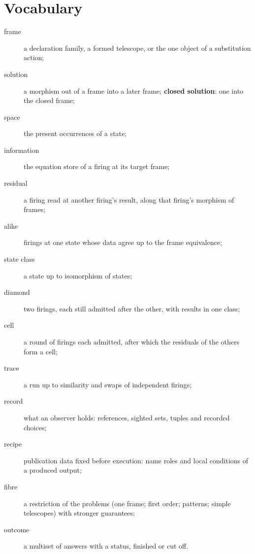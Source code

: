 \documentclass[11pt]{article}
\theoremstyle{remark}
\begin{document}
\section*{Vocabulary}
\begin{description}
\item[frame] a declaration family, a formed telescope, or the one object of a substitution action;
\item[solution] a morphism out of a frame into a later frame; \textbf{closed solution}: one into the closed frame;
\item[space] the present occurrences of a state;
\item[information] the equation store of a firing at its target frame;
\item[residual] a firing read at another firing's result, along that firing's morphism of frames;
\item[alike] firings at one state whose data agree up to the frame equivalence;
\item[state class] a state up to isomorphism of states;
\item[diamond] two firings, each still admitted after the other, with results in one class;
\item[cell] a round of firings each admitted, after which the residuals of the others form a cell;
\item[trace] a run up to similarity and swaps of independent firings;
\item[record] what an observer holds: references, sighted sets, tuples and recorded choices;
\item[recipe] publication data fixed before execution: name roles and local conditions of a produced output;
\item[fibre] a restriction of the problems (one frame; first order; patterns; simple telescopes) with stronger guarantees;
\item[outcome] a multiset of answers with a status, finished or cut off.
\end{description}
\end{document}
